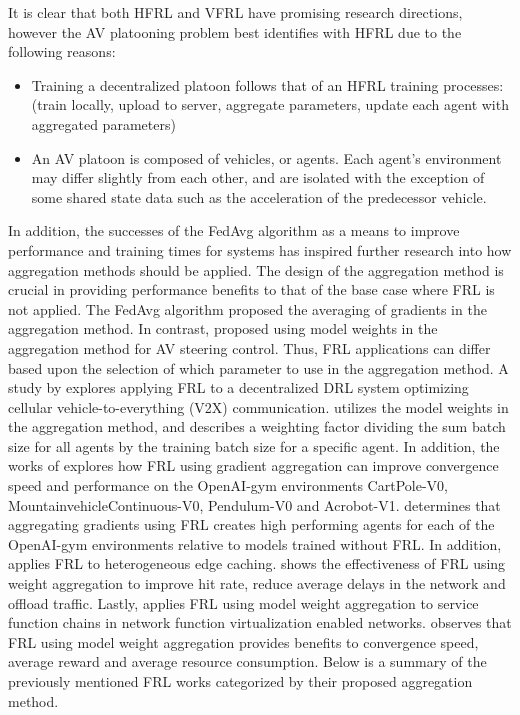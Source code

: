 It is clear that both HFRL and VFRL have promising research directions, however
the AV platooning problem best identifies with HFRL due to the following reasons:

\begin{itemize}
  \item Training a decentralized platoon follows that of an HFRL
  training processes: (train locally, upload to server, aggregate parameters, update
  each agent with aggregated parameters)
  \item An AV platoon is composed of vehicles, or agents. Each agent's environment may
  differ slightly from each other, and are isolated with the exception of some shared state
  data such as the acceleration of the predecessor vehicle.
\end{itemize}

In addition, the successes of the FedAvg algorithm as a means to improve performance and training
times for systems has inspired further research into how aggregation methods should
be applied.  The design of the aggregation method is crucial in providing performance
benefits to that of the base case where FRL is not applied.  The FedAvg
\cite{BrendanMcMahan2017a} algorithm proposed the averaging of gradients in the
aggregation method.  In contrast, \cite{Liang2019} proposed using model weights in
the aggregation method for AV steering control. Thus, FRL applications can differ
based upon the selection of which parameter to use in the aggregation method.  A study
by \cite{ZhangX2020} explores applying FRL to a decentralized DRL system optimizing
cellular vehicle-to-everything (V2X) communication. \cite{ZhangX2020} utilizes the model
weights in the aggregation method, and describes a weighting factor dividing the sum
batch size for all agents by the training batch size for a specific agent.  In addition,
the works of \cite{LimHyun2021} explores how FRL using gradient aggregation can improve
convergence speed and performance on the OpenAI-gym environments CartPole-V0,
MountainvehicleContinuous-V0, Pendulum-V0 and Acrobot-V1.  \cite{LimHyun2021} determines
that aggregating gradients using FRL creates high performing agents for each of the
OpenAI-gym environments relative to models trained without FRL.  In addition,
\cite{WangXiaofei2021} applies FRL to heterogeneous edge caching.  \cite{WangXiaofei2021}
shows the effectiveness of FRL using weight aggregation to improve hit rate, reduce
average delays in the network and offload traffic. Lastly, \cite{Huang2021} applies FRL
using model weight aggregation to service function chains in network function virtualization
enabled networks. \cite{Huang2021} observes that FRL using model weight aggregation
provides benefits to convergence speed, average reward and average resource consumption.
Below is a summary of the previously mentioned FRL works categorized by their proposed
aggregation method.

